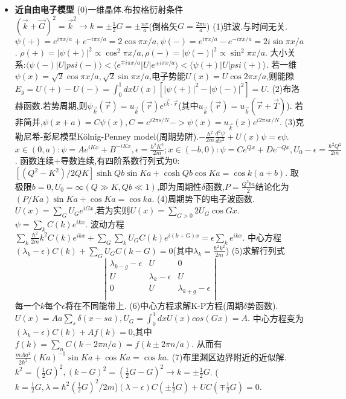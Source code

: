 \documentclass[UTF8,a4paper,3pt,twocolumn]{ctexart}
\begin{document}
\begin{itemize}
  \item \textbf{近自由电子模型}
  (0)一维晶体.布拉格衍射条件$(\vec{k}+\vec{G})^2=\vec{k}^2\rightarrow k=\pm\frac{1}{2}G=\pm\frac{n\pi}{a}$(倒格矢$G=\frac{2\pi n}{a}$)
  (1)驻波.与时间无关.$\psi(+)=e^{i\pi x/a}+e^{-i\pi x/a}=2\cos{\pi x/a},\psi(-)=e^{i\pi x/a}-e^{-i\pi x/a}=2i\sin{\pi x/a}$.
  $\rho(+)=|\psi(+)|^2\propto\cos^2{\pi x/a},\rho(-)=|\psi(-)|^2\propto\sin^2{\pi x/a}$.
  大小关系:$\langle\psi(-)|U|psi(-)\rangle<\langle e^{\mp i\pi x/a}|U|e^{\pm i\pi x/a}\rangle<\langle\psi(+)|U|psi(+)\rangle$.
  若一维$\psi(x)=\sqrt{2}\cos{\pi x/a},\sqrt{2}\sin{\pi x/a}$,电子势能$U(x)=U\cos{2\pi x/a}$,则能隙$E_g=U(+)-U(-)=\int_{0}^{1}dx U(x)[|\psi(+)|^2-|\psi(-)|^2]=U$.
  (2)布洛赫函数.若势周期,则$\psi_{\vec{k}}(\vec{r})=u_{\vec{k}}(\vec{r})e^{i\vec{k}\cdot\vec{r}}$(其中$u_{\vec{k}}(\vec{r})=u_{\vec{k}}(\vec{r}+\vec{T})$).
  若非简并,$\psi(x+a)=C\psi(x),C=e^{i2\pi s/N}->\psi(x)=u_{\vec{k}}(x)e^{i2\pi sx/N}$.
  (3)克勒尼希-彭尼模型Kölnig-Penney model(周期势阱).$-\frac{\hbar^2}{2m}\frac{d^2\psi}{dx^2}+U(x)\psi=\epsilon\psi$.
  $x\in(0,a):\psi=Ae^{iKx}+B^{-iKx},\epsilon=\frac{\hbar^2 K^2}{2m};x\in(-b,0):\psi=Ce^{Qx}+De^{-Qx},U_0-\epsilon=\frac{\hbar^2 Q^2}{2m}$.
  函数连续+导数连续,有四阶系数行列式为0:$[(Q^2-K^2)/2QK]\sinh{Qb}\sin{Ka}+\cosh{Qb}\cos{Ka}=\cos{k(a+b)}$.
  取极限$b=0,U_0=\infty(Q\gg K,Qb\ll 1)$,即为周期性$\delta$函数,$P=\frac{Q^2ba}{2}$结论化为$(P/Ka)\sin{Ka}+\cos{Ka}=\cos{ka}$.
  (4)周期势下的电子波函数.$U(x)=\sum_{G}U_{G}e^{iGx}$,若为实则$U(x)=\sum_{G>0}2U_G\cos{Gx}$.$\psi=\sum_{k}C(k)e^{ikx}$.
  波动方程$\sum_{k}\frac{\hbar^2}{2m}k^2C(k)e^{ikx}+\sum_{G}\sum_{k}U_G C(k)e^{i(k+G)x}=\epsilon\sum_{k}e^{ikx}$.
  中心方程$(\lambda_k-\epsilon)C(k)+\sum_{G}U_GC(k-G)=0$(其中$\lambda_k=\frac{\hbar^2 k^2}{2m}$)
  (5)求解行列式
  $$
  \left |\begin{array}{ccc}
   \lambda_{k-g}-\epsilon & U & 0  \\
   U & \lambda_{k}-\epsilon & U  \\
   0 & U & \lambda_{k+g}-\epsilon   \\
        \end{array}\right|
  $$
  每一个$k$每个$\epsilon$将在不同能带上.
  (6)中心方程求解K-P方程(周期$\delta$势函数).$U(x)=Aa\sum_{s}\delta(x-sa),U_G=\int_0^{1}dxU(x)cos(Gx)=A.$
  中心方程变为$(\lambda_k-\epsilon)C(k)+Af(k)=0$,其中$f(k)=\sum_{n}C(k-2\pi n/a)=f(k\pm 2\pi n/a)$.
  从而有$\frac{mAa^2}{2\hbar^2}(Ka)^{-1}\sin{Ka}+\cos{Ka}=\cos{ka}$.
  (7)布里渊区边界附近的近似解.
  $k^2=(\frac{1}{2}G)^2,(k-G)^2=(\frac{1}{2}G-G)^2\rightarrow k=\pm\frac{1}{2}G$.
  ($k=\frac{1}{2}G,\lambda=\hbar^2(\frac{1}{2}G)^2/2m$)$(\lambda-\epsilon)C(\pm\frac{1}{2}G)+UC(\mp\frac{1}{2}G)=0$.

\end{itemize}
\end{document}
